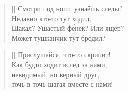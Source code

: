 \documentclass[a5paper,11pt]{memoir}
\begin{document}
\BgThispage

\newpage
\color{black}
\begin{verse}[\versewidth]
Смотри под ноги, узнаёшь следы? \\
Недавно кто-то тут ходил. \\
Шакал? Ушастый ф\'{е}нек? Или ящер? \\
Может тушканчик тут бродил?
\end{verse}

\begin{verse}[\versewidth]
Прислушайся, что-то скрипит! \\
Как будто ходит вслед за нами, \\
невидимый, но верный друг, \\
точь-в-точь шагая вместе с нами!
\end{verse}
\end{document}
